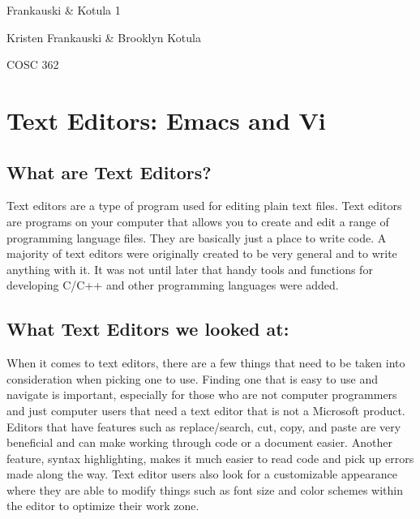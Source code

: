 \documentclass{article} %
\begin{document}


\noindent 

\noindent 

\noindent 

\noindent 

\noindent Frankauski \& Kotula 1

\noindent Kristen Frankauski \& Brooklyn Kotula

\noindent COSC 362 

\noindent 

\noindent 
\section{Text Editors:  Emacs and Vi}

\noindent 

\noindent 

\noindent 
\subsection{What are Text Editors?}

\noindent 

\noindent 

\noindent Text editors are a type of program used for editing plain text files. Text editors are programs on your computer that allows you to create and edit a range of programming language files. They are basically just a place to write code. A majority of text editors were originally created to be very general and to write anything with it. It was not until later that handy tools and functions for developing C/C++ and other programming languages were added.

\noindent 

\noindent 
\subsection{What Text Editors we looked at:}

\noindent 

\noindent 

\noindent When it comes to text editors, there are a few things that need to be taken into consideration when picking one to use. Finding one that is easy to use and navigate is important, especially for those who are not computer programmers and just computer users that need a text editor that is not a Microsoft product. Editors that have features such as replace/search, cut, copy, and paste are very beneficial and can make working through code or a document easier. Another feature, syntax highlighting, makes it much easier to read code and pick up errors made along the way. Text editor users also look for a customizable appearance where they are able to modify things such as font size and color schemes within the editor to optimize their work zone.
\end{document}
